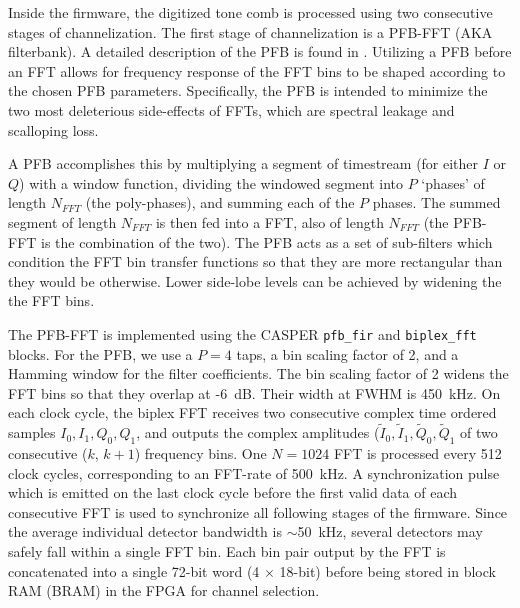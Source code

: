 Inside the firmware, the digitized tone comb is processed using two consecutive stages of channelization. The first stage of channelization is a PFB-FFT (AKA filterbank). A detailed description of the PFB is found in \citet{price2016spectrometers}. Utilizing a PFB before an FFT allows for frequency response of the FFT bins to be shaped according to the chosen PFB parameters. Specifically, the PFB is intended to minimize the two most deleterious side-effects of FFTs, which are spectral leakage and scalloping loss.

A PFB accomplishes this by multiplying a segment of timestream (for either $I$ or $Q$) with a window function, dividing the windowed segment into $P$ `phases' of length $N_{FFT}$ (the poly-phases), and summing each of the $P$ phases. The summed segment of length $N_{FFT}$ is then fed into a FFT, also of length $N_{FFT}$ (the PFB-FFT is the combination of the two). The PFB acts as a set of sub-filters which condition the FFT bin transfer functions so that they are more rectangular than they would be otherwise. Lower side-lobe levels can be achieved by widening the the FFT bins.

The PFB-FFT is implemented using the CASPER \texttt{pfb\_fir} and \texttt{biplex\_fft} blocks. For the PFB, we use a $P = 4$ taps, a bin scaling factor of 2, and a Hamming window for the filter coefficients. The bin scaling factor of 2 widens the FFT bins so that they overlap at -6~dB. Their width at FWHM is 450~kHz. On each clock cycle, the biplex FFT receives two consecutive complex time ordered samples $I_{0}, I_{1}, Q_{0}, Q_{1}$, and outputs the complex amplitudes ($\widetilde{I}_{0}, \widetilde{I}_{1}, \widetilde{Q}_{0}, \widetilde{Q}_{1}$ of two consecutive ($k$, $k + 1$) frequency bins. One $N = 1024$ FFT is processed every 512 clock cycles, corresponding to an FFT-rate of 500~kHz. A synchronization pulse which is emitted on the last clock cycle before the first valid data of each consecutive FFT is used to synchronize all following stages of the firmware. Since the average individual detector bandwidth is $\sim$50~kHz, several detectors may safely fall within a single FFT bin. Each bin pair output by the FFT is concatenated into a single 72-bit word (4 $\times$ 18-bit) before being stored in block RAM (BRAM) in the FPGA for channel selection.

